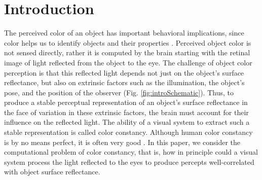 \documentclass{jov}
\begin{document}
\section{Introduction}
The perceived color of an object has important behavioral implications, since color helps us to identify objects and their properties \cite{Mollon89, Jacobs81}.
Perceived object color is not sensed directly, rather it is computed by the brain starting with the retinal image of light reflected from the object to the eye.
The challenge of object color perception is that this reflected light depends not just on the object's surface reflectance, but also on extrinsic factors such as the illumination, the object's pose,
and the position of the observer (Fig. \ref{fig:introSchematic}).
Thus, to produce a stable perceptual representation of an object's surface reflectance in the face of variation in these extrinsic factors, the brain must account for their influence on the reflected light.
The ability of a visual system to extract such a stable representation is called color constancy. Although human color constancy is by no means perfect, it is often very good \cite{FosterColorConstancy, BrainardColorConstancy}. 
In this paper, we consider the computational problem of color constancy, that is, how in principle could a visual system process the light reflected to the eyes to produce percepts well-correlated with object surface reflectance.
\end{document}
